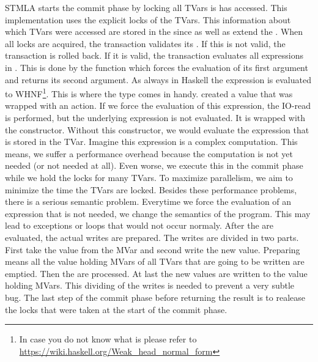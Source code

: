 STMLA starts the commit phase by locking all TVars is has accessed. This implementation 
uses the explicit locks of the TVars. This information about which TVars were accessed are 
stored in the  since  as well as  extend 
the .
When all locks are acquired, the transaction validates its .
If this is not valid, the transaction is rolled back.
If it is valid, the transaction evaluates all expressions in . This is done
by the  function which forces the evaluation of its first argument and returns 
its second argument. As always in Haskell the expression is evaluated to WHNF\footnote{In 
case you do not know what  is please refer to 
\url{https://wiki.haskell.org/Weak_head_normal_form}}. This is where the  type 
comes in handy.  created a  value that was wrapped with an
 action. If we force the evaluation of this expression, the 
IO-read is performed, but the underlying expression is not evaluated. It is wrapped 
with the  constructor. Without this constructor, we would evaluate the expression that 
is stored in the TVar. Imagine this expression is a complex computation. This means, we 
suffer a performance overhead because the computation is not yet needed (or not needed at all). 
Even worse, we execute this in the commit phase while we hold the locks for many TVars.
To maximize parallelism, we aim to minimize the time the TVars are locked. Besides these
performance problems, there is a serious semantic problem. Everytime we force the 
evaluation of an expression that is not needed, we change the semantics of the program.
This may lead to exceptions or loops that would not occur normaly.
After the  are evaluated, the actual writes are prepared. The writes are 
divided in two parts. First take the value from the MVar and second write the new value.
Preparing means all the value holding MVars of all TVars that are going to be written
are emptied. Then the  are processed. At last the new values are written
to the value holding MVars. This dividing of the writes is needed to prevent a very subtle bug. 
The last step of the commit phase before returning the result is to realease the locks
that were taken at the start of the commit phase.

